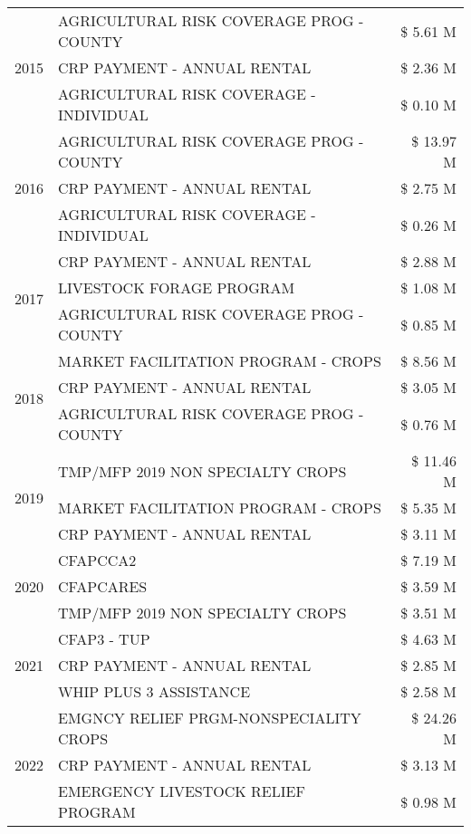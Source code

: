 \begin{tabular}{llr}
\cline{1-3}
\multirow[t]{3}{*}{2015} & AGRICULTURAL RISK COVERAGE PROG - COUNTY & \$ 5.61 M \\
 & CRP PAYMENT - ANNUAL RENTAL & \$ 2.36 M \\
 & AGRICULTURAL RISK COVERAGE - INDIVIDUAL & \$ 0.10 M \\
\cline{1-3}
\multirow[t]{3}{*}{2016} & AGRICULTURAL RISK COVERAGE PROG - COUNTY & \$ 13.97 M \\
 & CRP PAYMENT - ANNUAL RENTAL & \$ 2.75 M \\
 & AGRICULTURAL RISK COVERAGE - INDIVIDUAL & \$ 0.26 M \\
\cline{1-3}
\multirow[t]{3}{*}{2017} & CRP PAYMENT - ANNUAL RENTAL & \$ 2.88 M \\
 & LIVESTOCK FORAGE PROGRAM & \$ 1.08 M \\
 & AGRICULTURAL RISK COVERAGE PROG - COUNTY & \$ 0.85 M \\
\cline{1-3}
\multirow[t]{3}{*}{2018} & MARKET FACILITATION PROGRAM - CROPS & \$ 8.56 M \\
 & CRP PAYMENT - ANNUAL RENTAL & \$ 3.05 M \\
 & AGRICULTURAL RISK COVERAGE PROG - COUNTY & \$ 0.76 M \\
\cline{1-3}
\multirow[t]{3}{*}{2019} & TMP/MFP 2019 NON SPECIALTY CROPS & \$ 11.46 M \\
 & MARKET FACILITATION PROGRAM - CROPS & \$ 5.35 M \\
 & CRP PAYMENT - ANNUAL RENTAL & \$ 3.11 M \\
\cline{1-3}
\multirow[t]{3}{*}{2020} & CFAPCCA2 & \$ 7.19 M \\
 & CFAPCARES & \$ 3.59 M \\
 & TMP/MFP 2019 NON SPECIALTY CROPS & \$ 3.51 M \\
\cline{1-3}
\multirow[t]{3}{*}{2021} & CFAP3 - TUP & \$ 4.63 M \\
 & CRP PAYMENT - ANNUAL RENTAL & \$ 2.85 M \\
 & WHIP PLUS 3 ASSISTANCE & \$ 2.58 M \\
\cline{1-3}
\multirow[t]{3}{*}{2022} & EMGNCY RELIEF PRGM-NONSPECIALITY CROPS & \$ 24.26 M \\
 & CRP PAYMENT - ANNUAL RENTAL & \$ 3.13 M \\
 & EMERGENCY LIVESTOCK RELIEF PROGRAM & \$ 0.98 M \\
\cline{1-3}
\bottomrule
\end{tabular}
